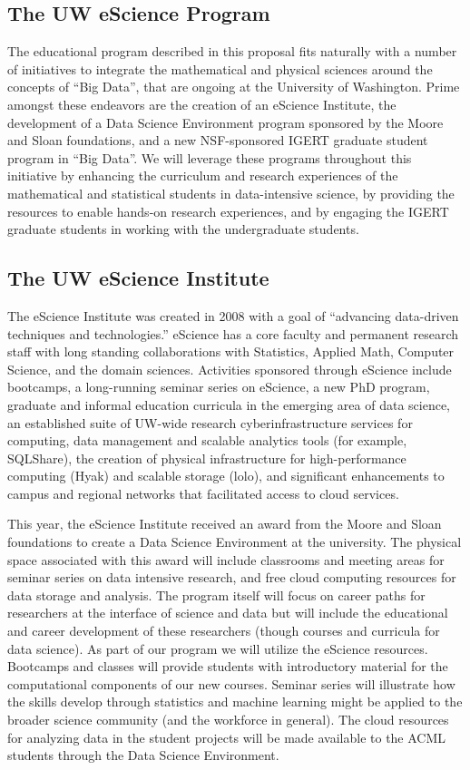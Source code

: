 \subsection{The UW eScience Program}
The educational program described in this proposal fits naturally with a number of initiatives to integrate the mathematical and physical sciences around the concepts of ``Big Data'', that are ongoing at the University of Washington. Prime amongst these endeavors are the creation of an eScience Institute, the development of a Data Science Environment program sponsored by the Moore and Sloan foundations, and a new NSF-sponsored IGERT graduate student program in ``Big Data''. We will leverage these programs throughout this initiative by enhancing the curriculum and research experiences of the mathematical and statistical students in data-intensive science, by providing the resources to enable hands-on research experiences, and by engaging the IGERT graduate students in working with the undergraduate students.

\subsection{The UW eScience Institute}

The eScience Institute was created in 2008 with a goal of “advancing data-driven techniques and technologies.” eScience has a core faculty and permanent research staff with long standing collaborations with Statistics, Applied Math, Computer Science, and the domain sciences. Activities sponsored through eScience include bootcamps, a long-running seminar series on eScience, a new PhD program, graduate and informal education curricula in the emerging area of data science, an established suite of UW-wide research cyberinfrastructure services for computing, data management and scalable analytics tools (for example, SQLShare), the creation of physical infrastructure for high-performance computing (Hyak) and scalable storage (lolo), and significant enhancements to campus and regional networks that facilitated access to cloud services.

This year, the eScience Institute received an award from the Moore and Sloan foundations to create a Data Science Environment at the university. The physical space associated with this award will include classrooms and meeting areas for seminar series on data intensive research, and free cloud computing resources for data storage and analysis. The program itself will focus on career paths for researchers at the interface of science and data but will include the educational and career development of these researchers (though courses and curricula for data science). As part of our program we will utilize the eScience resources.
 Bootcamps and classes will provide students with introductory material for the computational components of our new courses. Seminar series will illustrate how the skills develop through statistics and machine learning might be applied to the broader science community (and the workforce in general). The cloud resources for analyzing data in the student projects will be made available to the ACML students through the Data Science Environment.

